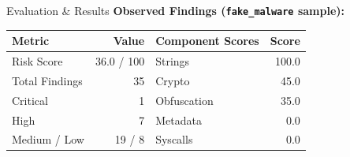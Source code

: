 \documentclass[aspectratio=169,11pt]{beamer}
\begin{document}
\begin{frame}{Evaluation \& Results}
    \textbf{Observed Findings (\texttt{fake\_malware} sample):}
    \vspace{1em}
    
    \begin{table}
        \centering
        \renewcommand{\arraystretch}{1.3}
        \begin{tabular}{lr | lr}
            \toprule
            \textbf{\color{primary}Metric} & \textbf{\color{primary}Value} & \textbf{\color{primary}Component Scores} & \textbf{\color{primary}Score} \\
            \midrule
            Risk Score & 36.0 / 100 & Strings & 100.0 \\
            Total Findings & 35 & Crypto & 45.0 \\
            Critical & 1 & Obfuscation & 35.0 \\
            High & 7 & Metadata & 0.0 \\
            Medium / Low & 19 / 8 & Syscalls & 0.0 \\
            \bottomrule
        \end{tabular}
    \end{table}
\end{frame}
\end{document}
